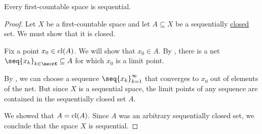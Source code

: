 \begin{proposition}\label{thm:first_countable_spaces_are_sequential}
  Every first-countable space is sequential.
\end{proposition}
\begin{proof}
  Let \( X \) be a first-countable space and let \( A \subseteq X \) be a sequentially \hyperref[def:sequential_topological_closure_operator]{closed} set. We must show that it is closed.

  Fix a point \( x_0 \in \operatorname{cl}(A) \). We will show that \( x_0 \in A \). By , there is a net \( \seq{ x_k }_{k \in \mscrK} \subseteq A \) for which \( x_0 \) is a limit point.

  By , we can choose a sequence \( \seq{ x_k }_{k=1}^\infty \) that converges to \( x_0 \) out of elements of the net. But since \( X \) is a sequential space, the limit points of any sequence are contained in the sequentially closed set \( A \).

  We showed that \( A = \operatorname{cl}(A) \). Since \( A \) was an arbitrary sequentially closed set, we conclude that the space \( X \) is sequential.
\end{proof}
